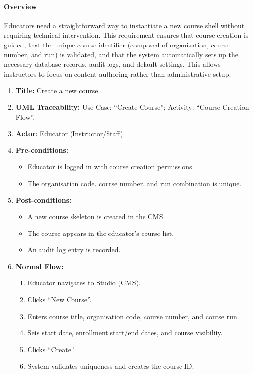 \paragraph{Overview}
Educators need a straightforward way to instantiate a new course shell without requiring technical intervention. This requirement ensures that course creation is guided, that the unique course identifier (composed of organisation, course number, and run) is validated, and that the system automatically sets up the necessary database records, audit logs, and default settings. This allows instructors to focus on content authoring rather than administrative setup.
\begin{enumerate}[label=\textbf{\arabic*.}]
\item \textbf{Title:} Create a new course.
\item \textbf{UML Traceability:} Use Case: “Create Course”; Activity: “Course Creation Flow”.
\item \textbf{Actor:} Educator (Instructor/Staff).
\item \textbf{Pre-conditions:} 
    \begin{itemize}
        \item Educator is logged in with course creation permissions.
        \item The organisation code, course number, and run combination is unique.
    \end{itemize}
\item \textbf{Post-conditions:}
    \begin{itemize}
        \item A new course skeleton is created in the CMS.
        \item The course appears in the educator’s course list.
        \item An audit log entry is recorded.
    \end{itemize}
\item \textbf{Normal Flow:}
    \begin{enumerate}
        \item Educator navigates to Studio (CMS).
        \item Clicks “New Course”.
        \item Enters course title, organisation code, course number, and course run.
        \item Sets start date, enrollment start/end dates, and course visibility.
        \item Clicks “Create”.
        \item System validates uniqueness and creates the course ID.

\end{enumerate}
\end{enumerate}
